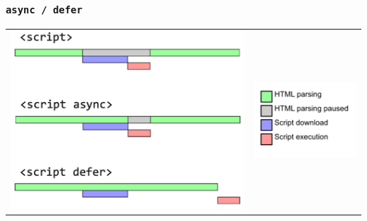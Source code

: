 \documentclass[a4paper, landscape, 8pt]{scrartcl}
\begin{document}
\begin{multicols*}{4}
        \subsubsection{\texttt{async / defer}}
        \begin{tabularx}{\columnwidth}{l X}
            \includegraphics[scale=0.25]{graphic/29-async-defer-loading-times} & \includegraphics[scale=0.4]{graphic/30-async-defer-legend}
        \end{tabularx}


\end{multicols*}
\end{document}
